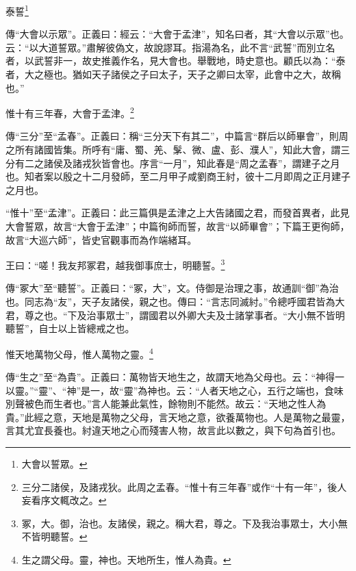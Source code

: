 泰誓\footnote{大會以誓眾。}

{\noindent\shu{}\fzkt 傳“大會以示眾”。正義曰：經云：“大會于孟津”，知名曰者，其“大會以示眾”也。云：“以大道誓眾。”肅解彼偽文，故說謬耳。指湯為名，此不言“武誓”而別立名者，以武誓非一，故史推義作名，見大會也。舉戰地，時史意也。顧氏以為：“泰者，大之極也。猶如天子諸侯之子曰太子，天子之卿曰太宰，此會中之大，故稱也。” \par}

惟十有三年春，大會于孟津。\footnote{三分二諸侯，及諸戎狄。此周之孟春。“惟十有三年春”或作“十有一年”，後人妄看序文輒改之。}

{\noindent\zhuan{}\fzbyks 傳“三分”至“孟春”。正義曰：稱“三分天下有其二”，中篇言“群后以師畢會”，則周之所有諸國皆集。所呼有“庸、蜀、羌、髳、微、盧、彭、濮人”，知此大會，謂三分有二之諸侯及諸戎狄皆會也。序言“一月”，知此春是“周之孟春”，謂建子之月也。知者案以殷之十二月發師，至二月甲子咸劉商王紂，彼十二月即周之正月建子之月也。 \par}

{\noindent\shu{}\fzkt “惟十”至“孟津”。正義曰：此三篇俱是孟津之上大告諸國之君，而發首異者，此見大會誓眾，故言“大會于孟津”；中篇徇師而誓，故言“以師畢會”；下篇王更徇師，故言“大巡六師”，皆史官觀事而為作端緒耳。 \par}

王曰：“嗟！我友邦冢君，越我御事庶士，明聽誓。\footnote{冢，大。御，治也。友諸侯，親之。稱大君，尊之。下及我治事眾士，大小無不皆明聽誓。}

{\noindent\zhuan{}\fzbyks 傳“冢大”至“聽誓”。正義曰：“冢，大”，文。侍御是治理之事，故通訓“御”為治也。同志為“友”，天子友諸侯，親之也。傳曰：“言志同滅紂。”令總呼國君皆為大君，尊之也。“下及治事眾士”，謂國君以外卿大夫及士諸掌事者。“大小無不皆明聽誓”，自士以上皆總戒之也。 \par}

惟天地萬物父母，惟人萬物之靈。\footnote{生之謂父母。靈，神也。天地所生，惟人為貴。}

{\noindent\zhuan{}\fzbyks 傳“生之”至“為貴”。正義曰：萬物皆天地生之，故謂天地為父母也。云：“神得一以靈。”“靈”、“神”是一，故“靈”為神也。云：“人者天地之心，五行之端也，食味別聲被色而生者也。”言人能兼此氣性，餘物則不能然。故云：“天地之性人為貴。”此經之意，天地是萬物之父母，言天地之意，欲養萬物也。人是萬物之最靈，言其尤宜長養也。紂違天地之心而殘害人物，故言此以數之，與下句為首引也。 \par}

